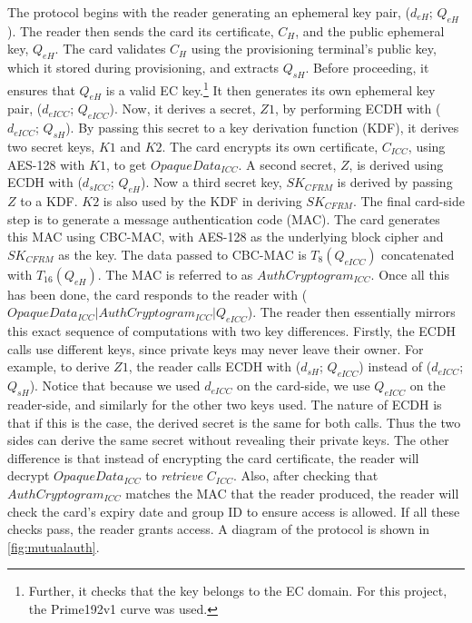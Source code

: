 \documentclass[12pt,a4paper,twoside,openright]{report}
\begin{document}
The protocol begins with the reader generating an ephemeral key pair, ($d_{eH}$; $Q_{eH}$). The reader then sends the card its certificate, $C_H$, and the public ephemeral key, $Q_{eH}$. The card validates $C_H$ using the provisioning terminal's public key, which it stored during provisioning, and extracts $Q_{sH}$. Before proceeding, it ensures that $Q_{eH}$ is a valid EC key.\footnote{Further, it checks that the key belongs to the EC domain. For this project, the Prime192v1 curve was used.} It then generates its own ephemeral key pair, ($d_{eICC}$; $Q_{eICC}$). Now, it derives a secret, $Z1$, by performing ECDH with ($d_{eICC}$; $Q_{sH}$). By passing this secret to a key derivation function (KDF), it derives two secret keys, $K1$ and $K2$. The card encrypts its own certificate, $C_{ICC}$, using AES-128 with $K1$, to get $OpaqueData_{ICC}$. A second secret, $Z$, is derived using ECDH with ($d_{sICC}$; $Q_{eH}$). Now a third secret key, $SK_{CFRM}$ is derived by passing $Z$ to a KDF. $K2$ is also used by the KDF in deriving $SK_{CFRM}$. The final card-side step is to generate a message authentication code (MAC). The card generates this MAC using CBC-MAC, with AES-128 as the underlying block cipher and $SK_{CFRM}$ as the key. The data passed to CBC-MAC is $T_8(Q_{eICC})$ concatenated with $T_{16}(Q_{eH})$. The MAC is referred to as $AuthCryptogram_{ICC}$. Once all this has been done, the card responds to the reader with ($OpaqueData_{ICC} \vert AuthCryptogram_{ICC} \vert Q_{eICC}$). The reader then essentially mirrors this exact sequence of computations with two key differences. Firstly, the ECDH calls use different keys, since private keys may never leave their owner. For example, to derive $Z1$, the reader calls ECDH with ($d_{sH}$; $Q_{eICC}$) instead of ($d_{eICC}$; $Q_{sH}$). Notice that because we used $d_{eICC}$ on the card-side, we use $Q_{eICC}$ on the reader-side, and similarly for the other two keys used. The nature of ECDH is that if this is the case, the derived secret is the same for both calls. Thus the two sides can derive the same secret without revealing their private keys. The other difference is that instead of encrypting the card certificate, the reader will decrypt $OpaqueData_{ICC}$ to \emph{retrieve} $C_{ICC}$. Also, after checking that $AuthCryptogram_{ICC}$ matches the MAC that the reader produced, the reader will check the card's expiry date and group ID to ensure access is allowed. If all these checks pass, the reader grants access. A diagram of the protocol is shown in \autoref{fig:mutualauth}.
\end{document}
